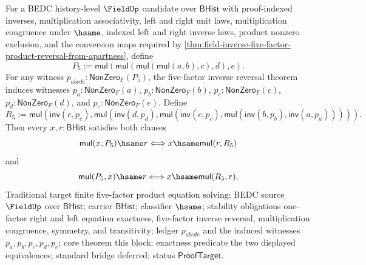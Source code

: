 \begin{theorem}
\label{thm:field-five-factor-product-equation-exact-from-apartness}
For a BEDC history-level $\FieldUp$ candidate over $\mathsf{BHist}$ with
proof-indexed inverses, multiplication associativity, left and right unit laws,
multiplication congruence under $\hsame$, indexed left and right inverse laws,
product nonzero exclusion, and the conversion maps required by
\autoref{thm:field-inverse-five-factor-product-reversal-from-apartness}, define
$$
P_5:=\mathsf{mul}(\mathsf{mul}(\mathsf{mul}(\mathsf{mul}(a,b),c),d),e).
$$
For any witness $p_{abcde}:\mathsf{NonZero}_F(P_5)$, the five-factor inverse
reversal theorem induces witnesses $p_a:\mathsf{NonZero}_F(a)$,
$p_b:\mathsf{NonZero}_F(b)$, $p_c:\mathsf{NonZero}_F(c)$,
$p_d:\mathsf{NonZero}_F(d)$, and $p_e:\mathsf{NonZero}_F(e)$. Define
$$
R_5:=\mathsf{mul}(\mathsf{inv}(e,p_e),
\mathsf{mul}(\mathsf{inv}(d,p_d),
\mathsf{mul}(\mathsf{inv}(c,p_c),
\mathsf{mul}(\mathsf{inv}(b,p_b),\mathsf{inv}(a,p_a))))).
$$
Then every $x,r:\mathsf{BHist}$ satisfies both clauses
$$
\mathsf{mul}(x,P_5)\hsame r
\Longleftrightarrow
x\hsame\mathsf{mul}(r,R_5)
$$
and
$$
\mathsf{mul}(P_5,x)\hsame r
\Longleftrightarrow
x\hsame\mathsf{mul}(R_5,r).
$$
Traditional target finite five-factor product equation solving; BEDC source
$\FieldUp$ over $\mathsf{BHist}$; carrier $\mathsf{BHist}$; classifier
$\hsame$; stability obligations one-factor right and left equation exactness,
five-factor inverse reversal, multiplication congruence, symmetry, and
transitivity; ledger $p_{abcde}$ and the induced witnesses
$p_a,p_b,p_c,p_d,p_e$; core theorem this block; exactness predicate the two
displayed equivalences; standard bridge deferred; status
$\mathsf{ProofTarget}$.
\end{theorem}
